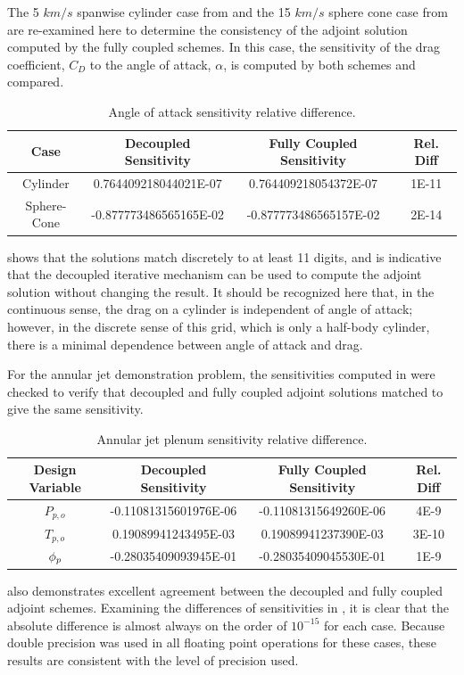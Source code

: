 The 5 $km/s$ spanwise cylinder case from  and the 15
$km/s$ sphere cone case from  are re-examined here
to determine the consistency of the adjoint solution computed by the fully
coupled schemes.  In this case, the sensitivity of the drag coefficient, $C_D$
to the angle of attack, $\alpha$, is computed by both schemes and compared.
\begin{table}[h]
  \centering
  \caption{Angle of attack sensitivity relative difference.}
  \begin{tabular}{c|c|c|c}
    Case & Decoupled Sensitivity & Fully Coupled Sensitivity & Rel. Diff\\
    \hline
    Cylinder    &  0.764409218044021E-07 &  0.764409218054372E-07 & 1E-11 \\
    Sphere-Cone & -0.877773486565165E-02 & -0.877773486565157E-02 & 2E-14
  \end{tabular}
  \label{tab:cylinder-adj-diff}
\end{table}
 shows that the solutions match discretely to at
least 11 digits, and is indicative that the decoupled iterative mechanism can be
used to compute the adjoint solution without changing the result.  It should be
recognized here that, in the continuous sense, the drag on a cylinder is
independent of angle of attack; however, in the discrete sense of this grid,
which is only a half-body cylinder, there is a minimal dependence between angle
of attack and drag.

For the annular jet demonstration problem, the sensitivities computed in
 were checked to verify that decoupled and fully
coupled adjoint solutions matched to give the same sensitivity.
\begin{table}[h]
  \centering
  \caption{Annular jet plenum sensitivity relative difference.}
  \begin{tabular}{c|c|c|c}
    Design Variable & Decoupled Sensitivity & Fully Coupled Sensitivity & Rel. Diff\\
    \hline
    $P_{p,o}$ & -0.11081315601976E-06 & -0.11081315649260E-06 & 4E-9  \\
    $T_{p,o}$ &  0.19089941243495E-03 &  0.19089941237390E-03 & 3E-10 \\
    $\phi_p$     & -0.28035409093945E-01 & -0.28035409045530E-01 & 1E-9
  \end{tabular}
  \label{tab:srp-adj-diff}
\end{table}
 also demonstrates excellent agreement between the
decoupled and fully coupled adjoint schemes.  Examining the differences of
sensitivities in , it is clear
that the absolute difference is almost always on the order of $10^{-15}$ for
each case.  Because double precision was used in all floating point operations for
these cases, these results are consistent with the level of precision used.

